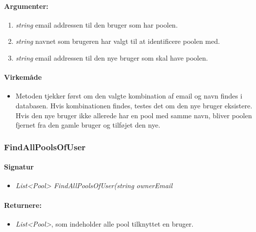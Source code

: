 \paragraph{Argumenter:}
\begin{enumerate}
	\item \textit{string} email addressen til den bruger som har poolen.
	\item \textit{string} navnet som brugeren har valgt til at identificere poolen med.
	\item \textit{string} email addressen til den nye bruger som skal have poolen.
\end{enumerate}

\paragraph{Virkemåde}
\begin{itemize}
	\item Metoden tjekker først om den valgte kombination af email og navn findes i databasen. Hvis kombinationen findes, testes det om den nye bruger eksistere. Hvis den nye bruger ikke allerede har en pool med samme navn, bliver poolen fjernet fra den gamle bruger og tilføjet den nye.
\end{itemize}






\subsubsection{FindAllPoolsOfUser}%








\paragraph{Signatur}
\begin{itemize}
	\item \textit{List<Pool> FindAllPoolsOfUser(string ownerEmail}
\end{itemize}

\paragraph{Returnere:}
\begin{itemize}
	\item \textit{List<Pool>}, som indeholder alle pool tilknyttet en bruger.
\end{itemize}

